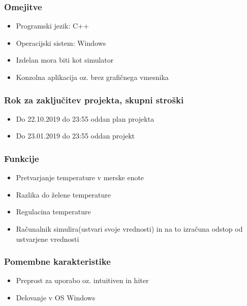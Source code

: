 \documentclass[a4paper,12pt]{article}
\begin{document}
		\subsubsection{Omejitve}

				\begin{itemize}
					\item Programski jezik: C++
					\item Operacijski sistem: Windows
					\item Izdelan mora biti kot simulator
					\item Konzolna aplikacija oz. brez grafičnega vmesnika
				\end{itemize}

		\subsubsection{Rok za zaključitev projekta, skupni stroški}

				\begin{itemize}
					\item Do 22.10.2019 do 23:55 oddan plan projekta 
					\item Do 23.01.2019 do 23:55 oddan projekt
				\end{itemize}

		\subsubsection{Funkcije}

				\begin{itemize}
					\item Pretvarjanje temperature v merske enote
					\item Razlika do želene temperature
					\item Regulacina temperature
					\item Računalnik simulira(ustvari svoje vrednosti) in na to	izračuna odstop od ustvarjene vrednosti
				\end{itemize}

		\subsubsection{Pomembne karakteristike}

				\begin{itemize}
					\item Preprost za uporabo oz. intuitiven in hiter
					\item Delovanje v OS Windows
				\end{itemize}
\end{document}
